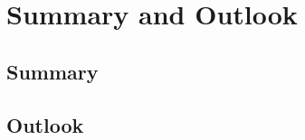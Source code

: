 \chapter{Summary and Outlook}
\label{summary}
 
\section{Summary}

\blindtext[2]

\section{Outlook}

\blindtext[3]
